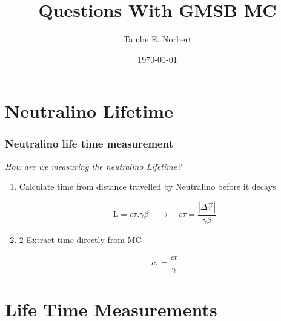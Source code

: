 \documentclass{beamer}
\title{Questions With GMSB MC}
\subtitle{}
\author{Tambe E. Norbert} %
\institute{University Of Minnesota}
\date{\today}
\begin{document}
\begin{frame}
        \titlepage
        \begin{center}
    \href{mailto:norbe072@umn.edu}{}
        \end{center}
\end{frame}


\section{Neutralino Lifetime}

\begin{frame}
    \frametitle{Neutralino life time measurement}
    \begin{LARGE}  
  \textit{How are we measuring the neutralino Lifetime?}
    \end{LARGE}
    \begin{enumerate}
    \item Calculate time from distance travelled by Neutralino before it decays
       \begin{Definition}
        \begin{displaymath}     
    \mathrm{L} = c\tau.\gamma \beta \quad \rightarrow  \quad c\tau = \frac{|\Delta\overrightarrow{r}|}{\gamma \beta}
    \end{displaymath}
    \end{Definition}
     \item 2 Extract time directly from MC
    \begin{Definition}[MC Time]
   \begin{displaymath}     
    c\tau = \frac{ct}{\gamma}
    \end{displaymath}
    \end{Definition}
       
    \end{enumerate}

    
\end{frame}


\section{Life Time Measurements}    
\end{document}
